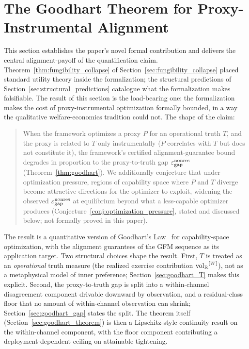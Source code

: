 \section{The Goodhart Theorem for Proxy-Instrumental Alignment}
\label{sec:goodhart}

This section establishes the paper's novel formal contribution and
delivers the central alignment-payoff of the quantification claim.
Theorem~\ref{thm:fungibility_collapse} of
Section~\ref{sec:fungibility_collapse} placed standard utility
theory inside the formalization; the structural predictions of
Section~\ref{sec:structural_predictions} catalogue what the
formalization makes falsifiable.  The result of this section is the
load-bearing one: the formalization makes the cost of
proxy-instrumental optimization formally bounded, in a way the
qualitative welfare-economics tradition could not.  The shape of
the claim:

\begin{quote}
When the framework optimizes a proxy $P$ for an operational
truth $T$, and the proxy is related to $T$ only instrumentally
($P$ correlates with $T$ but does not constitute it), the
framework's certified alignment-guarantee bound degrades in
proportion to the proxy-to-truth gap $\varepsilon_{\mathrm{gap}}^{\mathrm{nonres}}$
(Theorem~\ref{thm:goodhart}).  We additionally conjecture that
under optimization pressure, regions of capability space where
$P$ and $T$ diverge become attractive directions for the
optimizer to exploit, widening the observed $\varepsilon_{\mathrm{gap}}^{\mathrm{nonres}}$ at
equilibrium beyond what a less-capable optimizer produces
(Conjecture~\ref{conj:optimization_pressure}, stated and
discussed below; not formally proved in this paper).
\end{quote}

The result is a quantitative version of Goodhart's
Law~\citep{strathern1997improving,manheim2019categorizing} for
capability-space optimization, with the alignment guarantees of the
GFM sequence as its application target.  Two structural choices
shape the result.  First, $T$ is treated as an \emph{operational}
truth measure (the realized exercise contribution
${\operatorname{vol}_{\mathrm{R}}}^{[W]}$), not as a metaphysical model of inner preference;
Section~\ref{sec:goodhart_T} makes this explicit.  Second, the
proxy-to-truth gap is split into a within-channel disagreement
component drivable downward by observation, and a residual-class
floor that no amount of within-channel observation can shrink;
Section~\ref{sec:goodhart_gap} states the split.  The theorem itself
(Section~\ref{sec:goodhart_theorem}) is then a Lipschitz-style
continuity result on the within-channel component, with the floor
component contributing a deployment-dependent ceiling on attainable
tightening.

